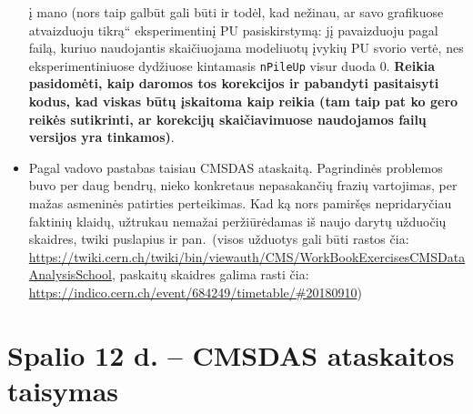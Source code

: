 \documentclass[a4paper, 12pt]{article}
\newcommand{\ltq}[1]{{\quotedblbase{}#1\textquotedblleft{}}}
\newcommand{\ttt}[1]{\texttt{#1}}
\begin{document}
\begin{itemize}
	į mano (nors taip galbūt gali būti ir todėl, kad nežinau, ar savo grafikuose
	atvaizduoju \ltq{tikrą} eksperimentinį PU pasiskirstymą: jį pavaizduoju pagal
	failą, kuriuo naudojantis skaičiuojama modeliuotų įvykių PU svorio vertė, nes
	eksperimentiniuose dydžiuose kintamasis \ttt{nPileUp} visur duoda 0.
	\textbf{Reikia pasidomėti, kaip daromos tos korekcijos ir pabandyti pasitaisyti
	kodus, kad viskas būtų įskaitoma kaip reikia (tam taip pat ko gero reikės
	sutikrinti, ar korekcijų skaičiavimuose naudojamos failų versijos yra tinkamos)}.
	\item Pagal vadovo pastabas taisiau CMSDAS ataskaitą. Pagrindinės problemos buvo
	per daug bendrų, nieko konkretaus nepasakančių frazių vartojimas, per mažas
	asmeninės patirties perteikimas. Kad ką nors pamiršęs nepridaryčiau faktinių
	klaidų, užtrukau nemažai peržiūrėdamas iš naujo darytų užduočių skaidres,
	twiki puslapius ir pan.\ (visos užduotys gali būti rastos čia:
	\url{https://twiki.cern.ch/twiki/bin/viewauth/CMS/WorkBookExercisesCMSDataAnalysisSchool},
	paskaitų skaidres galima rasti čia: \url{https://indico.cern.ch/event/684249/timetable/#20180910})
\end{itemize}

\section{Spalio 12 d. -- CMSDAS ataskaitos taisymas}
\end{document}
